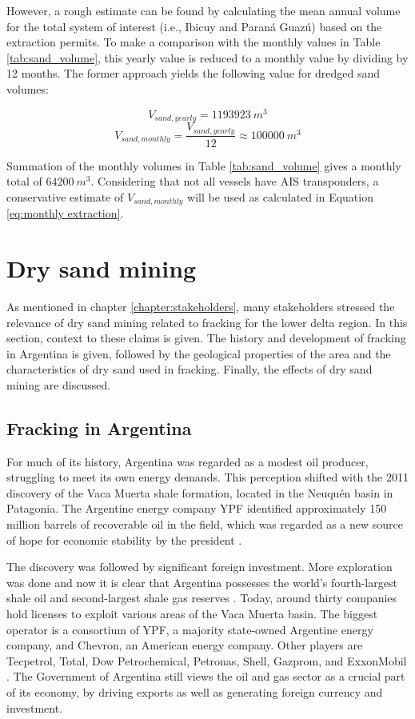 However, a rough estimate can be found by calculating the mean annual volume for the total system of interest (i.e., Ibicuy and Paraná Guazú) based on the extraction permits. To make a comparison with the monthly values in Table \ref{tab:sand_volume}, this yearly value is reduced to a monthly value by dividing by 12 months. The former approach yields the following value for dredged sand volumes:

\begin{equation}
    V_{sand,yearly} = 1193923 ~m^3
\end{equation}
\begin{equation}
\label{eq:monthly extraction}
    V_{sand,monthly} = \frac{V_{sand,yearly}}{12} \approx 100000 ~m^3
\end{equation}

Summation of the monthly volumes in Table \ref{tab:sand_volume} gives a monthly total of $64200 ~m^3$. Considering that not all vessels have AIS transponders, a conservative estimate of $V_{sand,monthly}$ will be used as calculated in Equation \ref{eq:monthly extraction}.

\section{Dry sand mining}
As mentioned in chapter \ref{chapter:stakeholders}, many stakeholders stressed the relevance of dry sand mining related to fracking for the lower delta region. In this section, context to these claims is given. The history and development of fracking in Argentina is given, followed by the geological properties of the area and the characteristics of dry sand used in fracking. Finally, the effects of dry sand mining are discussed.

\subsection{Fracking in Argentina}
For much of its history, Argentina was regarded as a modest oil producer, struggling to meet its own energy demands. This perception shifted with the 2011 discovery of the Vaca Muerta shale formation, located in the Neuquén basin in Patagonia. The Argentine energy company YPF identified approximately 150 million barrels of recoverable oil in the field, which was regarded as a new source of hope for economic stability by the president \autocite{kraussArgentinaHopesBig2011}.

The discovery was followed by significant foreign investment. More exploration was done and now it is clear that Argentina possesses the world’s fourth-largest shale oil and second-largest shale gas reserves \autocite{internationaltradeadministrationArgentinaCountryCommercial2025}. Today, around thirty companies hold licenses to exploit various areas of the Vaca Muerta basin. The biggest operator is a consortium of YPF, a majority state-owned Argentine energy company, and Chevron, an American energy company. Other players are Tecpetrol, Total, Dow Petrochemical, Petronas, Shell, Gazprom, and ExxonMobil \autocite{fogliaSedArena2023}. The Government of Argentina still views the oil and gas sector as a crucial part of its economy, by driving exports as well as generating foreign currency and investment.

